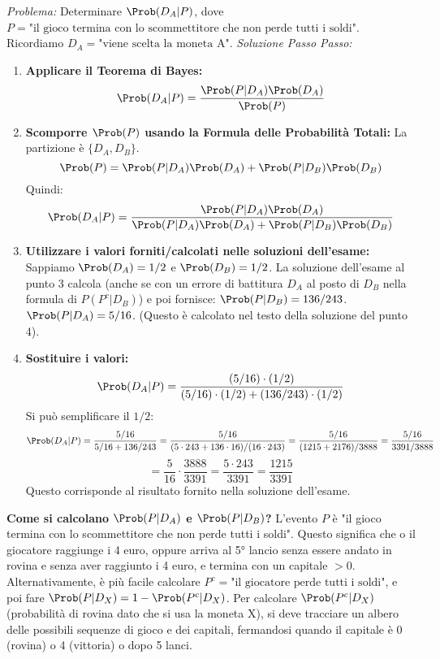 \begin{example}
\textit{Problema:} Determinare $\Prob(D_A|P)$, dove $P = \text{"il gioco termina con lo scommettitore che non perde tutti i soldi"}$.
Ricordiamo $D_A = \text{"viene scelta la moneta A"}$.
\textit{Soluzione Passo Passo:}
\begin{enumerate}
    \item \textbf{Applicare il Teorema di Bayes:}
    \[ \Prob(D_A|P) = \frac{\Prob(P|D_A)\Prob(D_A)}{\Prob(P)} \]
    \item \textbf{Scomporre $\Prob(P)$ usando la Formula delle Probabilità Totali:}
    La partizione è $\{D_A, D_B\}$.
    \[ \Prob(P) = \Prob(P|D_A)\Prob(D_A) + \Prob(P|D_B)\Prob(D_B) \]
    Quindi:
    \[ \Prob(D_A|P) = \frac{\Prob(P|D_A)\Prob(D_A)}{\Prob(P|D_A)\Prob(D_A) + \Prob(P|D_B)\Prob(D_B)} \]
    \item \textbf{Utilizzare i valori forniti/calcolati nelle soluzioni dell'esame:}
    Sappiamo $\Prob(D_A) = 1/2$ e $\Prob(D_B) = 1/2$.
    La soluzione dell'esame al punto 3 calcola (anche se con un errore di battitura $D_A$ al posto di $D_B$ nella formula di $P(P^c|D_B)$) e poi fornisce:
    $\Prob(P|D_B) = 136/243$.
    $\Prob(P|D_A) = 5/16$. (Questo è calcolato nel testo della soluzione del punto 4).
    \item \textbf{Sostituire i valori:}
    \[ \Prob(D_A|P) = \frac{(5/16) \cdot (1/2)}{(5/16) \cdot (1/2) + (136/243) \cdot (1/2)} \]
    Si può semplificare il $1/2$:
    \[ \Prob(D_A|P) = \frac{5/16}{5/16 + 136/243} = \frac{5/16}{(5 \cdot 243 + 136 \cdot 16)/(16 \cdot 243)} = \frac{5/16}{(1215 + 2176)/3888} = \frac{5/16}{3391/3888} \]
    \[ = \frac{5}{16} \cdot \frac{3888}{3391} = \frac{5 \cdot 243}{3391} = \frac{1215}{3391} \]
    Questo corrisponde al risultato fornito nella soluzione dell'esame.
\end{enumerate}
\textbf{Come si calcolano $\Prob(P|D_A)$ e $\Prob(P|D_B)$?}
L'evento $P$ è "il gioco termina con lo scommettitore che non perde tutti i soldi". Questo significa che o il giocatore raggiunge i 4 euro, oppure arriva al 5° lancio senza essere andato in rovina e senza aver raggiunto i 4 euro, e termina con un capitale $>0$.
Alternativamente, è più facile calcolare $P^c = \text{"il giocatore perde tutti i soldi"}$, e poi fare $\Prob(P|D_X) = 1 - \Prob(P^c|D_X)$.
Per calcolare $\Prob(P^c|D_X)$ (probabilità di rovina dato che si usa la moneta X), si deve tracciare un albero delle possibili sequenze di gioco e dei capitali, fermandosi quando il capitale è 0 (rovina) o 4 (vittoria) o dopo 5 lanci.

\end{example}
